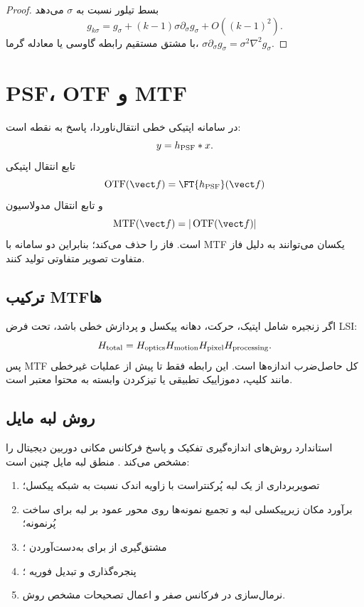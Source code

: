 \begin{proof}
بسط تیلور نسبت به \(\sigma\) می‌دهد
\begin{equation}
g_{k\sigma}=g_\sigma+(k-1)\sigma\partial_\sigma g_\sigma+O((k-1)^2).
\end{equation}
با مشتق مستقیم رابطه گاوسی یا معادله گرما، \(\sigma\partial_\sigma g_\sigma=\sigma^2\nabla^2g_\sigma\).
\end{proof}

\section{PSF، OTF و MTF}

در سامانه اپتیکی خطی انتقال‌ناوردا، پاسخ به نقطه  است:
\begin{equation}
y=h_{\rm PSF}*x.
\end{equation}
تابع انتقال اپتیکی
\begin{equation}
\operatorname{OTF}(\vect f)=\FT\{h_{\rm PSF}\}(\vect f)
\end{equation}
و تابع انتقال مدولاسیون
\begin{equation}
\operatorname{MTF}(\vect f)=|\operatorname{OTF}(\vect f)|
\end{equation}
است.  فاز را حذف می‌کند؛ بنابراین دو سامانه با MTF یکسان می‌توانند به دلیل فاز متفاوت تصویر
متفاوتی تولید کنند.

\subsection{ترکیب MTFها}
اگر زنجیره شامل اپتیک، حرکت، دهانه پیکسل و پردازش خطی باشد، تحت فرض LSI:
\begin{equation}
H_{\rm total}=H_{\rm optics}H_{\rm motion}H_{\rm pixel}H_{\rm processing}.
\end{equation}
پس MTF کل حاصل‌ضرب اندازه‌ها است. این رابطه فقط تا پیش از عملیات غیرخطی مانند کلیپ، دموزاییک تطبیقی یا
تیزکردن وابسته به محتوا معتبر است.

\subsection{روش لبه مایل}
استاندارد  روش‌های اندازه‌گیری تفکیک و پاسخ فرکانس مکانی دوربین دیجیتال را مشخص
می‌کند \cite{iso12233_2024}. منطق لبه مایل چنین است:
\begin{enumerate}
\item تصویربرداری از یک لبه پُرکنتراست با زاویه اندک نسبت به شبکه پیکسل؛
\item برآورد مکان زیرپیکسلی لبه و تجمیع نمونه‌ها روی محور عمود بر لبه برای ساخت  پُرنمونه؛
\item مشتق‌گیری از  برای به‌دست‌آوردن ؛
\item پنجره‌گذاری و تبدیل فوریه ؛
\item نرمال‌سازی در فرکانس صفر و اعمال تصحیحات مشخص روش.
\end{enumerate}

